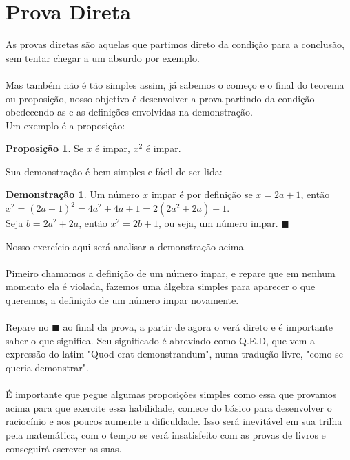 \documentclass[a4paper,11pt,oneside]{book}
\theoremstyle{definition}
\theoremstyle{break}
\newtheorem{demonstration}{Demonstração}[section]
\newtheorem{proposition}{Proposição}
\begin{document}
\section{Prova Direta}
As provas diretas são aquelas que partimos direto da condição para a conclusão, sem tentar chegar a um absurdo por exemplo.
\\
\\
Mas também não é tão simples assim, já sabemos o começo e o final do teorema ou proposição, nosso objetivo é desenvolver a prova partindo da condição obedecendo-as e as definições envolvidas na demonstração.
\\
Um exemplo é a proposição:
\begin{proposition}
Se $x$ é impar, $x^2$ é impar.
\end{proposition}
Sua demonstração é bem simples e fácil de ser lida:
\begin{demonstration}
Um número $x$ impar é por definição se $x=2a+1$, então $x^2 = (2a+1)^2 = 4a^2 + 4a +1 = 2(2a^2 + 2a) +1$.\\
Seja $b=2a^2 + 2a$, então $x^2 = 2b+1$, ou seja, um número impar. $\blacksquare$
\end{demonstration}
Nosso exercício aqui será analisar a demonstração acima.
\\
\\
Pimeiro chamamos a definição de um número impar, e repare que em nenhum momento ela é violada, fazemos uma álgebra simples para aparecer o que queremos, a definição de um número impar novamente.
\\
\\
Repare no $\blacksquare$ ao final da prova, a partir de agora o verá direto e é importante saber o que significa. Seu significado é abreviado como Q.E.D, que vem a expressão do latim "Quod erat demonstrandum", numa tradução livre, "como se queria demonstrar".
\\
\\
É importante que pegue algumas proposições simples como essa que provamos acima para que exercite essa habilidade, comece do básico para desenvolver o raciocínio e aos poucos aumente a dificuldade. Isso será inevitável em sua trilha pela matemática, com o tempo se verá insatisfeito com as provas de livros e conseguirá escrever as suas.
\end{document}
